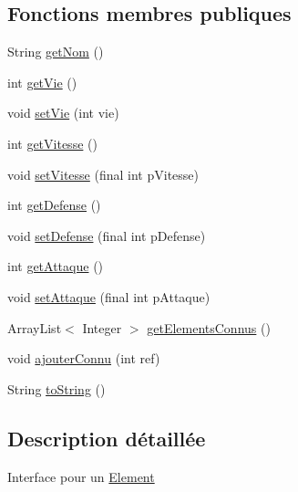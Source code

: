 \subsection*{Fonctions membres publiques}
\begin{DoxyCompactItemize}
\item 
String \hyperlink{interfaceindividu_1_1_i_element_a7783ed1b115d522ddd6a8a0c2aded632}{get\-Nom} ()
\item 
int \hyperlink{interfaceindividu_1_1_i_element_a2f5272cb7b7f334bb9352cc2010c0abe}{get\-Vie} ()
\item 
void \hyperlink{interfaceindividu_1_1_i_element_a386d0b896afaf5481da8c6f667b11297}{set\-Vie} (int vie)
\item 
int \hyperlink{interfaceindividu_1_1_i_element_a824b3ce0b020526307476e9a50a98518}{get\-Vitesse} ()
\item 
void \hyperlink{interfaceindividu_1_1_i_element_a50c000c10b016186ff3becd67ae5d5ae}{set\-Vitesse} (final int p\-Vitesse)
\item 
int \hyperlink{interfaceindividu_1_1_i_element_a9299fee825c29161f0e8bc401fbf36c3}{get\-Defense} ()
\item 
void \hyperlink{interfaceindividu_1_1_i_element_a3a877d4f796c0b27d12cbd7f1ebd0b46}{set\-Defense} (final int p\-Defense)
\item 
int \hyperlink{interfaceindividu_1_1_i_element_a2994427419f339274b17290846d259b9}{get\-Attaque} ()
\item 
void \hyperlink{interfaceindividu_1_1_i_element_a7ebc66e084c6063079f1db0543ba2dcc}{set\-Attaque} (final int p\-Attaque)
\item 
Array\-List$<$ Integer $>$ \hyperlink{interfaceindividu_1_1_i_element_abb2ad9e31a3500c3c4deaaf58f9e01c9}{get\-Elements\-Connus} ()
\item 
void \hyperlink{interfaceindividu_1_1_i_element_a8c265785d6fb0f25cc54ec5850c602d3}{ajouter\-Connu} (int ref)
\item 
String \hyperlink{interfaceindividu_1_1_i_element_a4609baa01e8f8558e931b2f8901e789d}{to\-String} ()
\end{DoxyCompactItemize}


\subsection{Description détaillée}
Interface pour un \hyperlink{classindividu_1_1_element}{Element} 

